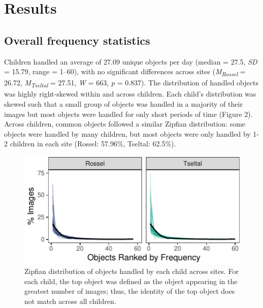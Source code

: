 \documentclass[10pt, letterpaper]{article}
\newenvironment{CodeChunk}{}{}
\begin{document}
\hypertarget{results}{%
\section{Results}\label{results}}

\hypertarget{overall-frequency-statistics}{%
\subsection{Overall frequency
statistics}\label{overall-frequency-statistics}}

Children handled an average of 27.09 unique objects per day (median =
27.5, \emph{SD} = 15.79, range = 1--60), with no significant differences
across sites (\emph{M}\textsubscript{\emph{Rossel}} = 26.72,
\emph{M}\textsubscript{\emph{Tseltal}} = 27.51, \emph{W} = 663, \emph{p}
= 0.837). The distribution of handled objects was highly right-skewed
within and across children. Each child's distribution was skewed such
that a small group of objects was handled in a majority of their images
but most objects were handled for only short periods of time (Figure 2).
Across children, common objects followed a similar Zipfian distribution:
some objects were handled by many children, but most objects were only
handled by 1-2 children in each site (Rossel: 57.96\%, Tseltal: 62.5\%).

\begin{CodeChunk}
\begin{figure}[h]

{\centering \includegraphics{figs/zipfian-objects-fig-1} 

}

\caption[Zipfian distribution of objects handled by each child across sites]{Zipfian distribution of objects handled by each child across sites. For each child, the top object was defined as the object appearing in the greatest number of images; thus, the identity of the top object does not match across all children.}\label{fig:zipfian-objects-fig}
\end{figure}
\end{CodeChunk}
\end{document}
